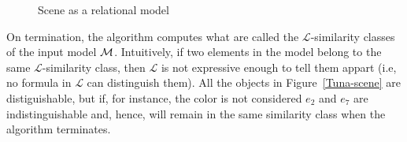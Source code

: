 \begin{figure}[ht]
\begin{minipage}[b]{0.5\linewidth}
\vspace*{-.4cm}\caption{Scene as a relational model}
\label{TUNA-scene-graph}
\end{minipage}
\end{figure}


On termination, the algorithm computes what are called the $\mathcal{L}$-similarity classes of the input model $\mathcal{M}$. Intuitively, if two elements in the model belong to the same $\mathcal{L}$-similarity class, then $\mathcal{L}$ is not expressive enough to tell them appart (i.e, no formula in $\mathcal{L}$ can distinguish them). All the objects in Figure~\ref{Tuna-scene} are distiguishable, but if, for instance, the color is not considered $e_2$ and $e_7$ are indistinguishable and, hence, will remain in the same similarity class when the algorithm terminates. 

